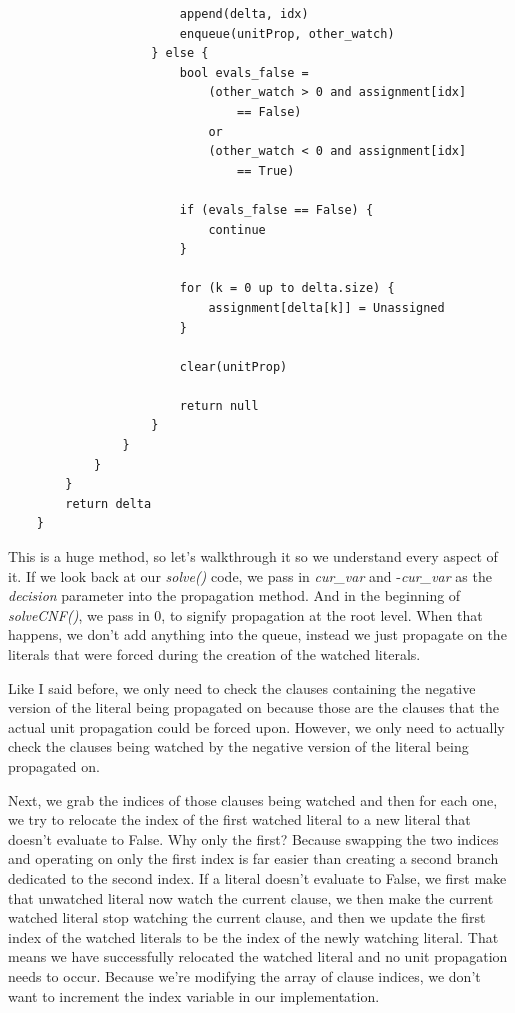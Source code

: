 \documentclass[../main.tex]{subfiles}
\begin{document}
\begin{lstlisting}
                        append(delta, idx)
                        enqueue(unitProp, other_watch)
                    } else {
                        bool evals_false =
                            (other_watch > 0 and assignment[idx] 
                                == False) 
                            or
                            (other_watch < 0 and assignment[idx] 
                                == True)

                        if (evals_false == False) {
                            continue
                        }

                        for (k = 0 up to delta.size) {
                            assignment[delta[k]] = Unassigned
                        }

                        clear(unitProp)

                        return null
                    }
                }
            }
        }
        return delta
    }
\end{lstlisting}

This is a huge method, so let's walkthrough it so we understand every aspect of it. 
If we look back at our \textit{solve()} code, we pass in \textit{cur\_var} and 
-\textit{cur\_var} as the \textit{decision} parameter into the propagation method. 
And in the beginning of \textit{solveCNF()}, we pass in $0$, to signify propagation at the 
root level. When that happens, we don't add anything into the queue, instead we just propagate 
on the literals that were forced during the creation of the watched literals. 

Like I said before, we only need to check the clauses containing the negative version of the 
literal being propagated on because those are the clauses that the actual unit propagation could 
be forced upon. However, we only need to actually check the clauses being watched by the negative 
version of the literal being propagated on. 

Next, we grab the indices of those clauses being watched and then for each one, we try 
to relocate the index of the first watched literal to a new literal that doesn't evaluate 
to False. Why only the first? Because swapping the two indices and operating on only the 
first index is far easier than creating a second branch dedicated to the second index.
If a literal doesn't evaluate to False, we first make that unwatched literal now watch 
the current clause, we then make the current watched literal stop watching the current clause,
and then we update the first index of the watched literals to be the index of the newly 
watching literal. That means we have successfully relocated the watched literal and no 
unit propagation needs to occur. Because we're modifying the array of clause indices, 
we don't want to increment the index variable in our implementation.
\end{document}
